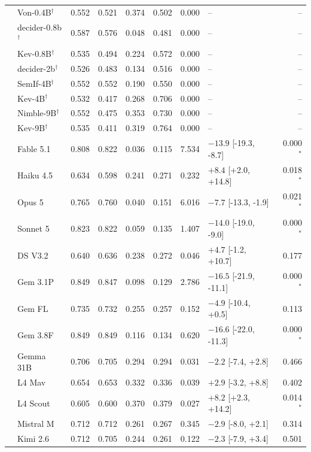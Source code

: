 \begin{longtable}{llrrrrrlr}
 & Von-0.4B$^{\dagger}$ & 0.552 & 0.521 & 0.374 & 0.502 & 0.000 & -- & -- \\
 & decider-0.8b$^{\dagger}$ & 0.587 & 0.576 & 0.048 & 0.481 & 0.000 & -- & -- \\
 & Kev-0.8B$^{\dagger}$ & 0.535 & 0.494 & 0.224 & 0.572 & 0.000 & -- & -- \\
 & decider-2b$^{\dagger}$ & 0.526 & 0.483 & 0.134 & 0.516 & 0.000 & -- & -- \\
 & SemIf-4B$^{\dagger}$ & 0.552 & 0.552 & 0.190 & 0.550 & 0.000 & -- & -- \\
 & Kev-4B$^{\dagger}$ & 0.532 & 0.417 & 0.268 & 0.706 & 0.000 & -- & -- \\
 & Nimble-9B$^{\dagger}$ & 0.552 & 0.475 & 0.353 & 0.730 & 0.000 & -- & -- \\
 & Kev-9B$^{\dagger}$ & 0.535 & 0.411 & 0.319 & 0.764 & 0.000 & -- & -- \\
 & Fable 5.1 & 0.808 & 0.822 & 0.036 & 0.115 & 7.534 & $-13.9$ [-19.3, -8.7] & 0.000$^{*}$ \\
 & Haiku 4.5 & 0.634 & 0.598 & 0.241 & 0.271 & 0.232 & $+8.4$ [+2.0, +14.8] & 0.018$^{*}$ \\
 & Opus 5 & 0.765 & 0.760 & 0.040 & 0.151 & 6.016 & $-7.7$ [-13.3, -1.9] & 0.021$^{*}$ \\
 & Sonnet 5 & 0.823 & 0.822 & 0.059 & 0.135 & 1.407 & $-14.0$ [-19.0, -9.0] & 0.000$^{*}$ \\
 & DS V3.2 & 0.640 & 0.636 & 0.238 & 0.272 & 0.046 & $+4.7$ [-1.2, +10.7] & 0.177 \\
 & Gem 3.1P & 0.849 & 0.847 & 0.098 & 0.129 & 2.786 & $-16.5$ [-21.9, -11.1] & 0.000$^{*}$ \\
 & Gem FL & 0.735 & 0.732 & 0.255 & 0.257 & 0.152 & $-4.9$ [-10.4, +0.5] & 0.113 \\
 & Gem 3.8F & 0.849 & 0.849 & 0.116 & 0.134 & 0.620 & $-16.6$ [-22.0, -11.3] & 0.000$^{*}$ \\
 & Gemma 31B & 0.706 & 0.705 & 0.294 & 0.294 & 0.031 & $-2.2$ [-7.4, +2.8] & 0.466 \\
 & L4 Mav & 0.654 & 0.653 & 0.332 & 0.336 & 0.039 & $+2.9$ [-3.2, +8.8] & 0.402 \\
 & L4 Scout & 0.605 & 0.600 & 0.370 & 0.379 & 0.027 & $+8.2$ [+2.3, +14.2] & 0.014$^{*}$ \\
 & Mistral M & 0.712 & 0.712 & 0.261 & 0.267 & 0.345 & $-2.9$ [-8.0, +2.1] & 0.314 \\
 & Kimi 2.6 & 0.712 & 0.705 & 0.244 & 0.261 & 0.122 & $-2.3$ [-7.9, +3.4] & 0.501 \\

\end{longtable}

